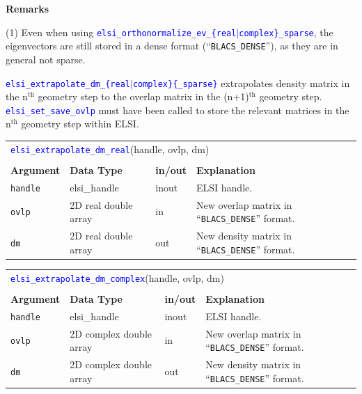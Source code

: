 \documentclass{report}
\newcommand{\api}[1]{\textcolor{blue}{\texttt{#1}}}
\begin{document}
\textbf{Remarks}

(1) Even when using \api{elsi\_orthonormalize\_ev\_\{real$\vert$complex\}\_sparse}, the eigenvectors are still stored in a dense format (``\texttt{BLACS\_DENSE}''), as they are in general not sparse.

\api{elsi\_extrapolate\_dm\_\{real$\vert$complex\}\{\_sparse\}} extrapolates density matrix in the n$^\text{th}$ geometry step to the overlap matrix in the (n+1)$^\text{th}$ geometry step. \api{elsi\_set\_save\_ovlp} must have been called to store the relevant matrices in the n$^\text{th}$ geometry step within ELSI.

\begin{tabular}[]{|p{20mm}|p{40mm}|p{10mm}|p{92mm}|}
\multicolumn{4}{l}{\api{elsi\_extrapolate\_dm\_real}(handle, ovlp, dm)}\\
\multicolumn{4}{l}{}\\
\hline
\multicolumn{1}{|l|}{\textbf{Argument}} & \multicolumn{1}{l|}{\textbf{Data Type}} & \multicolumn{1}{l|}{\textbf{in/out}} & \multicolumn{1}{l|}{\textbf{Explanation}}\\
\hline
\texttt{handle} & elsi\_handle         & inout & ELSI handle.\\
\hline
\texttt{ovlp}   & 2D real double array & in    & New overlap matrix in ``\texttt{BLACS\_DENSE}'' format.\\
\hline
\texttt{dm}     & 2D real double array & out   & New density matrix in ``\texttt{BLACS\_DENSE}'' format.\\
\hline
\end{tabular}

\begin{tabular}[]{|p{20mm}|p{40mm}|p{10mm}|p{92mm}|}
\multicolumn{4}{l}{\api{elsi\_extrapolate\_dm\_complex}(handle, ovlp, dm)}\\
\multicolumn{4}{l}{}\\
\hline
\multicolumn{1}{|l|}{\textbf{Argument}} & \multicolumn{1}{l|}{\textbf{Data Type}} & \multicolumn{1}{l|}{\textbf{in/out}} & \multicolumn{1}{l|}{\textbf{Explanation}}\\
\hline
\texttt{handle} & elsi\_handle            & inout & ELSI handle.\\
\hline
\texttt{ovlp}   & 2D complex double array & in    & New overlap matrix in ``\texttt{BLACS\_DENSE}'' format.\\
\hline
\texttt{dm}     & 2D complex double array & out   & New density matrix in ``\texttt{BLACS\_DENSE}'' format.\\
\hline
\end{tabular}
\end{document}
